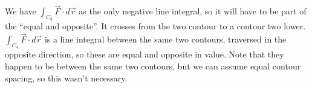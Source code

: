 \documentclass[12pt,letterpaper,noanswers]{exam}
\begin{document}
\begin{questions}
\begin{parts}
\begin{solution}
We have $\int_{C_3} \vec F\cdot d\vec r$ as the only negative line integral, so it will have to be part of the ``equal and opposite''.  It crosses from the two contour to a contour two lower.  $\int_{C_4} \vec F\cdot d\vec r$ is a line integral between the same two contours, traversed in the opposite direction, so these are equal and opposite in value.  Note that they happen to be between the same two contours, but we can assume equal contour spacing, so this wasn't necessary.
\end{solution}

\end{parts}













\end{questions}
\end{document}
